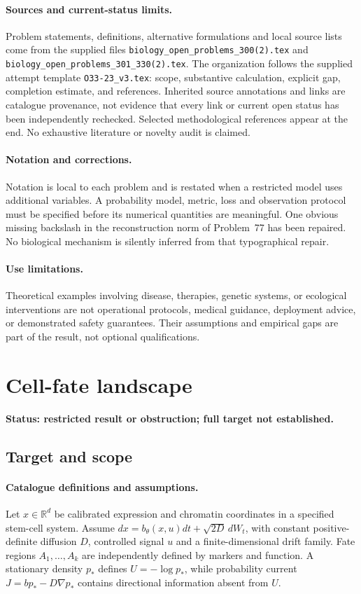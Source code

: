 \documentclass[11pt]{article}
\begin{document}
\paragraph{Sources and current-status limits.}
Problem statements, definitions, alternative formulations and local source lists
come from the supplied files
\texttt{biology\_open\_problems\_300(2).tex} and
\texttt{biology\_open\_problems\_301\_330(2).tex}.
The organization follows the supplied attempt template
\texttt{O33-23\_v3.tex}: scope, substantive calculation, explicit gap,
completion estimate, and references. Inherited source annotations and links are
catalogue provenance, not evidence that every link or current open status has
been independently rechecked. Selected methodological references appear at the
end. No exhaustive literature or novelty audit is claimed.

\paragraph{Notation and corrections.}
Notation is local to each problem and is restated when a restricted model uses
additional variables. A probability model, metric, loss and observation protocol
must be specified before its numerical quantities are meaningful. One obvious
missing backslash in the reconstruction norm of Problem~77 has been repaired.
No biological mechanism is silently inferred from that typographical repair.

\paragraph{Use limitations.}
Theoretical examples involving disease, therapies, genetic systems, or ecological
interventions are not operational protocols, medical guidance, deployment advice,
or demonstrated safety guarantees. Their assumptions and empirical gaps are part
of the result, not optional qualifications.


\section*{Cell-fate landscape}
\label{prob:125}
\noindent\textbf{Status: restricted result or obstruction; full target not established.}
\subsection{Target and scope}
\paragraph{Catalogue definitions and assumptions.}
Let $x\in\mathbb{R}^d$ be calibrated expression and chromatin coordinates in a specified stem-cell system. Assume $dx=b_\theta(x,u)dt+\sqrt{2D}\,dW_t$, with constant positive-definite diffusion $D$, controlled signal $u$ and a finite-dimensional drift family. Fate regions $A_1,\ldots,A_k$ are independently defined by markers and function. A stationary density $p_*$ defines $U=-\log p_*$, while probability current $J=b p_*-D\nabla p_*$ contains directional information absent from $U$.
\end{document}
